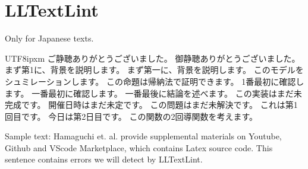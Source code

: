 \section{LLTextLint}

Only for Japanese texts.

\begin{CJK}{UTF8}{ipxm}
	ご静聴ありがとうございました。
	御静聴ありがとうございました。
	まず第1に、背景を説明します。
	まず第一に、背景を説明します。
	このモデルをシュミレーションします。
	この命題は帰納法で証明できます。
	1番最初に確認します。
	一番最初に確認します。
	一番最後に結論を述べます。
	この実装はまだ未完成です。
	開催日時はまだ未定です。
	この問題はまだ未解決です。
	これは第1回目です。
	今日は第2日目です。
	この関数の2回導関数を考えます。
\end{CJK}

Sample text: Hamaguchi et. al. provide supplemental materials on Youtube, Github and VScode Marketplace, which contains Latex source code. This sentence contains errors we will detect by LLTextLint.
